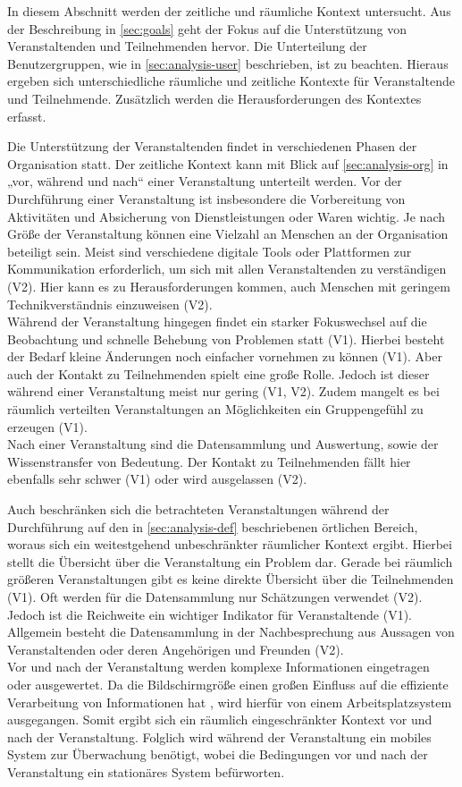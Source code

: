 In diesem Abschnitt werden der zeitliche und räumliche Kontext untersucht. Aus
der Beschreibung in \autoref{sec:goals} geht der Fokus auf die Unterstützung von
Veranstaltenden und Teilnehmenden hervor. Die Unterteilung der Benutzergruppen,
wie in \autoref{sec:analysis-user} beschrieben, ist zu beachten. Hieraus ergeben
sich unterschiedliche räumliche und zeitliche Kontexte für Veranstaltende und
Teilnehmende. Zusätzlich werden die Herausforderungen des Kontextes erfasst.

Die Unterstützung der Veranstaltenden findet in verschiedenen Phasen der
Organisation statt. Der zeitliche Kontext kann mit Blick auf
\autoref{sec:analysis-org} in „vor, während und nach“ einer Veranstaltung
unterteilt werden. Vor der Durchführung einer Veranstaltung ist insbesondere die
Vorbereitung von Aktivitäten und Absicherung von Dienstleistungen oder Waren
wichtig. Je nach Größe der Veranstaltung können eine Vielzahl an
Menschen an der Organisation beteiligt sein. Meist sind verschiedene digitale
Tools oder Plattformen zur Kommunikation erforderlich, um sich mit allen
Veranstaltenden zu verständigen (V2). Hier kann es zu Herausforderungen kommen,
auch Menschen mit geringem Technikverständnis einzuweisen (V2).
\\
Während der Veranstaltung hingegen findet ein starker Fokuswechsel auf die
Beobachtung und schnelle Behebung von Problemen statt (V1). Hierbei besteht der
Bedarf kleine Änderungen noch einfacher vornehmen zu können (V1). Aber auch der
Kontakt zu Teilnehmenden spielt eine große Rolle. Jedoch ist dieser während
einer Veranstaltung meist nur gering (V1, V2). Zudem mangelt es bei räumlich
verteilten Veranstaltungen an Möglichkeiten ein Gruppengefühl zu erzeugen (V1).
\\
Nach einer Veranstaltung sind die Datensammlung und Auswertung, sowie der
Wissenstransfer von Bedeutung. Der Kontakt zu Teilnehmenden fällt hier ebenfalls
sehr schwer (V1) oder wird ausgelassen (V2).

Auch beschränken sich die betrachteten Veranstaltungen während der Durchführung
auf den in \autoref{sec:analysis-def} beschriebenen örtlichen Bereich, woraus
sich ein weitestgehend unbeschränkter räumlicher Kontext ergibt. Hierbei stellt
die Übersicht über die Veranstaltung ein Problem dar. Gerade bei räumlich
größeren Veranstaltungen gibt es keine direkte Übersicht über die Teilnehmenden
(V1). Oft werden für die Datensammlung nur Schätzungen verwendet (V2). Jedoch
ist die Reichweite ein wichtiger Indikator für Veranstaltende (V1). Allgemein
besteht die Datensammlung in der Nachbesprechung aus Aussagen von
Veranstaltenden oder deren Angehörigen und Freunden (V2). \\
Vor und nach der Veranstaltung werden komplexe Informationen eingetragen oder
ausgewertet. Da die Bildschirmgröße einen großen Einfluss auf die effiziente
Verarbeitung von Informationen hat \cite{Ni2006}, wird hierfür von einem
Arbeitsplatzsystem ausgegangen. Somit ergibt sich ein räumlich eingeschränkter
Kontext vor und nach der Veranstaltung. Folglich wird während der Veranstaltung
ein mobiles System zur Überwachung benötigt, wobei die Bedingungen vor und nach
der Veranstaltung ein stationäres System befürworten.

